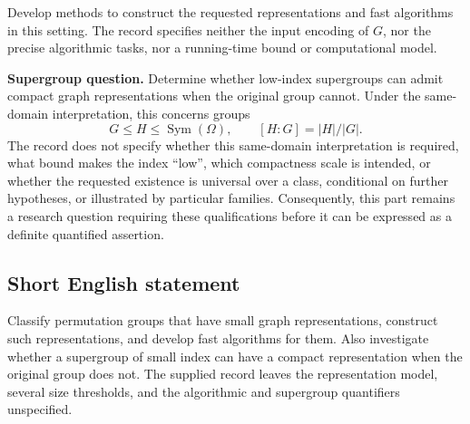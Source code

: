 \documentclass[11pt]{article}
\begin{document}
Develop methods to construct the requested representations and fast algorithms in this setting. The record specifies neither the input encoding of \(G\), nor the precise algorithmic tasks, nor a running-time bound or computational model.

\textbf{Supergroup question.} Determine whether low-index supergroups can admit compact graph representations when the original group cannot. Under the same-domain interpretation, this concerns groups
\[
G\leq H\leq\operatorname{Sym}(\Omega),\qquad [H:G]=|H|/|G|.
\]
The record does not specify whether this same-domain interpretation is required, what bound makes the index ``low'', which compactness scale is intended, or whether the requested existence is universal over a class, conditional on further hypotheses, or illustrated by particular families. Consequently, this part remains a research question requiring these qualifications before it can be expressed as a definite quantified assertion.
\subsection{Short English statement}
Classify permutation groups that have small graph representations, construct such representations, and develop fast algorithms for them. Also investigate whether a supergroup of small index can have a compact representation when the original group does not. The supplied record leaves the representation model, several size thresholds, and the algorithmic and supergroup quantifiers unspecified.
\end{document}
